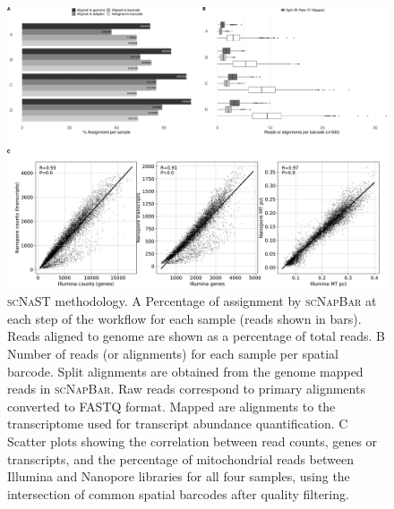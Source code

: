 \documentclass[utf8]{frontiers_suppmat} %
\newcommand{\scn}{\textsc{scNapBar}\xspace}
\newcommand{\scnast}{\textsc{scNaST}\xspace}
\begin{document}
\begin{figure}[htbp]
\begin{center}
\includegraphics[width=\textwidth]{figS1}%
\end{center}
\caption{\scnast methodology. A Percentage of assignment by \scn at each step of the workflow for each sample (reads shown in bars). Reads aligned to genome are shown as a percentage of total reads. B Number of reads (or alignments) for each sample per spatial barcode. Split alignments are obtained from the genome mapped reads in \scn. Raw reads correspond to primary alignments converted to FASTQ format. Mapped are alignments to the transcriptome used for transcript abundance quantification. C Scatter plots showing the correlation between read counts, genes or transcripts, and the percentage of mitochondrial reads between Illumina and Nanopore libraries for all four samples, using the intersection of common spatial barcodes after quality filtering.}\label{fig:S1}
\end{figure}
\end{document}

